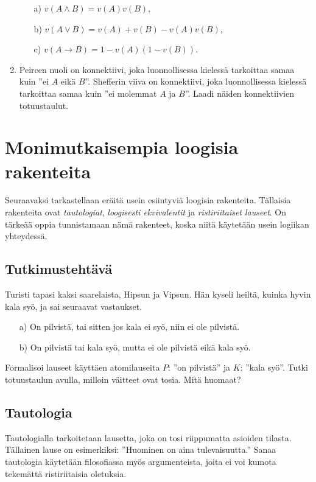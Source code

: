 \begin{enumerate}
\begin{itemize}
\item[a)] $v(A\land B)=v(A)v(B)$,
\item[b)] $v(A\lor B)=v(A)+v(B)- v(A)v(B)$,
\item[c)] $v(A\to B)=1-v(A)(1-v(B))$.
\end{itemize}

\item
Peircen nuoli on konnektiivi, joka luonnollisessa kielessä tarkoittaa samaa kuin ''ei $A$ eikä $B$''. Shefferin viiva on konnektiivi, joka luonnollisessa kielessä tarkoittaa samaa kuin ''ei molemmat $A$ ja $B$''. Laadi näiden konnektiivien totuustaulut. 
\end{enumerate}

\newpage

\section{Monimutkaisempia loogisia rakenteita}
\label{monimloog}
Seuraavaksi tarkastellaan eräitä usein esiintyviä loogisia rakenteita. Tällaisia rakenteita ovat {\em tautologiat}, {\em loogisesti ekvivalentit} ja {\em ristiriitaiset lauseet}. On tärkeää oppia tunnistamaan nämä rakenteet, koska niitä käytetään usein logiikan yhteydessä.

\subsection*{Tutkimustehtävä}
Turisti tapasi kaksi saarelaista, Hipsun ja Vipsun. Hän kyseli heiltä, kuinka hyvin kala syö, ja sai seuraavat vastaukset.
\begin{enumerate}
\item[a)] On pilvistä, tai sitten jos kala ei syö, niin ei ole pilvistä.
\item[b)] On pilvistä tai kala syö, mutta ei ole pilvistä eikä kala syö.
\end{enumerate}
Formalisoi lauseet käyttäen atomilauseita $P$: ''on pilvistä'' ja $K$: ''kala syö''. Tutki totuustaulun avulla, milloin väitteet ovat tosia. Mitä huomaat?

\subsection*{Tautologia}
Tautologialla tarkoitetaan lausetta, joka on tosi riippumatta asioiden tilasta. Tällainen lause on esimerkiksi: ''Huominen on aina tulevaisuutta.'' Sanaa tautologia käytetään filosofiassa myös argumenteista, joita ei voi kumota tekemättä ristiriitaisia oletuksia.

